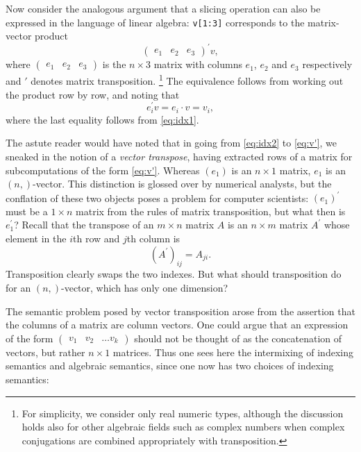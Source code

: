 Now consider the analogous argument that a slicing operation can also be
expressed in the language of linear algebra: \lstinline|v[1:3]| corresponds to
the matrix-vector product
\begin{equation}
	\begin{pmatrix}e_1 & e_2 & e_3\end{pmatrix}^\prime v,\label{eq:idx2}
\end{equation}
where $\begin{pmatrix}e_1 & e_2 & e_3\end{pmatrix}$ is the $n \times 3$
matrix with columns $e_1$, $e_2$ and $e_3$ respectively and $'$ denotes matrix
transposition.%
\footnote{For simplicity, we consider only real numeric types, although the
discussion holds also for other algebraic fields such as complex numbers when
complex conjugations are combined appropriately with transposition.}
The equivalence follows from working out the product row by row,
and noting that
\begin{equation}
	e_i^\prime v = e_i \cdot v = v_i,\label{eq:v'}
\end{equation}
where the last equality follows from \eqref{eq:idx1}.

The astute reader would have noted that in going from \eqref{eq:idx2} to
\eqref{eq:v'}, we sneaked in the notion of a \textit{vector transpose}, having
extracted rows of a matrix for subcomputations of the form \eqref{eq:v'}.
Whereas $(e_1)$ is an $n \times 1$ matrix, $e_1$ is an $(n,)$-vector. This
distinction is glossed over by numerical analysts, but the conflation of these
two objects poses a problem for computer scientists: $(e_1)^\prime$ must be
a $1 \times n$ matrix from the rules of matrix transposition, but what then is
$e_1^\prime$? Recall that the transpose of an $m \times n$ matrix $A$ is an
$n \times m$ matrix $A^\prime$ whose element in the $i$th row and $j$th column
is
\begin{equation}
	\left(A^\prime\right)_{ij} = A_{ji}.\label{eq:A'}
\end{equation}
Transposition clearly swaps the two indexes. But what should transposition do
for an $(n,)$-vector, which has only one dimension?

The semantic problem posed by vector transposition arose from the assertion
that the columns of a matrix are column vectors. One could argue that an
expression of the form $\begin{pmatrix}v_1 & v_2 & \dots v_k \end{pmatrix}$
should not be thought of as the concatenation of vectors, but rather $n\times1$
matrices. Thus one sees here the intermixing of indexing semantics and
algebraic semantics, since one now has two choices of indexing semantics:

